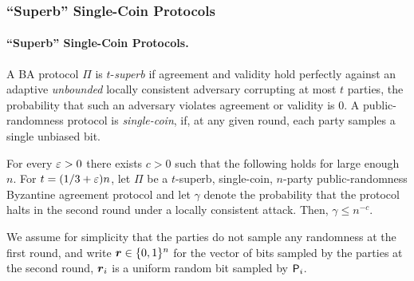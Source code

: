 \subsubsection{``Superb'' Single-Coin Protocols}\label{sec:technique:3:1}
\else
\paragraph{``Superb'' Single-Coin Protocols.}%
\fi
A BA protocol $\Pi$ is $t$-\emph{superb} if  agreement and validity hold perfectly against an adaptive \emph{unbounded} locally consistent adversary corrupting at most $t$ parties, \ie  the probability that such an adversary violates agreement or validity
is $0$.  A  public-randomness protocol is \emph{single-coin}, if, at any given round, each party samples a single unbiased bit.

\begin{theorem}\label{bound:KKL}
For every $\varepsilon> 0$ there exists $c>0$ such that the following holds for large enough $n$. For $t=(1/3+\varepsilon) n$, let $\Pi$ be a $t$-superb, single-coin, $n$-party public-randomness Byzantine agreement protocol and let $\gamma$ denote the probability that the protocol halts in the second round under a locally consistent attack. Then, $\gamma\le n^{-c}$.
\end{theorem}


We assume for simplicity  that the parties do not sample any randomness at the first round, and  write ${ \boldsymbol{r}}\in {\{0,1\}^n}$ for the vector of bits sampled by the parties at the second round, \ie ${ \boldsymbol{r}}_i$ is a uniform random bit sampled by $\mathsf{P}_i$.




